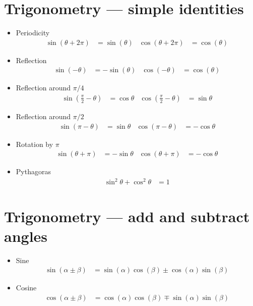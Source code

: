 \section{Trigonometry --- simple identities}
\begin{itemize}
 \item Periodicity
\begin{align*}
  \sin(\theta+2\pi) &= \sin(\theta) &
  \cos(\theta+2\pi) &= \cos(\theta)
\end{align*}
\item Reflection
\begin{align*}
  \sin(-\theta)&=-\sin(\theta) & \cos(-\theta) &=\cos(\theta)
\end{align*}
\item Reflection around $\pi/4$
\begin{align*}
\sin\left(\tfrac{\pi}{2}-\theta\right)&=\cos\theta &
\cos\left(\tfrac{\pi}{2}-\theta\right)&=\sin\theta
\end{align*}
\item Reflection around $\pi/2$
\begin{align*}
\sin\left(\pi-\theta\right)&=\sin\theta &
\cos\left(\pi-\theta\right)&=-\cos\theta
\end{align*}
\item Rotation by $\pi$
\begin{align*}
\sin\left(\theta+\pi\right)&=-\sin\theta &
\cos\left(\theta+\pi\right)&=-\cos\theta
\end{align*}
\item Pythagoras
\begin{align*}
\sin^2\theta + \cos^2 \theta &=1
\end{align*}

\end{itemize}

\section{Trigonometry --- add and subtract angles}\label{sec trig add}
\begin{itemize}
 \item Sine
\begin{align*}
  \sin(\alpha \pm \beta) &= \sin(\alpha)\cos(\beta) \pm \cos(\alpha)\sin(\beta)
  \end{align*}
 \item Cosine
\begin{align*}
  \cos(\alpha \pm \beta) &= \cos(\alpha)\cos(\beta) \mp \sin(\alpha)\sin(\beta)
\end{align*}

\end{itemize}

